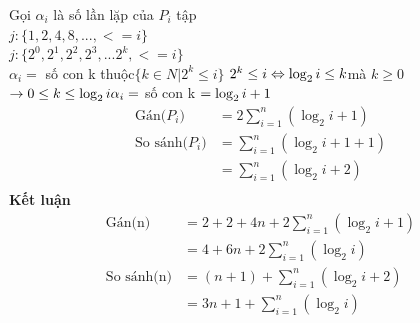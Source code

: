 \documentclass[10pt,a4paper]{article}
\begin{document}
    Gọi $\alpha_i$ là số lần lặp của $P_i$
    tập\\ $j:\{1,2,4,8,...,<=i\}$\\
    $j:\{2^0,2^1,2^2,2^3,...2^k,<=i\}$\\
    $\alpha_i = $ số con k thuộc$\{k\in N|2^k \leq i\}$
    $
        2^k \leq i\\
        \Leftrightarrow \log_2 i\leq k\\
        $mà $ k\geq 0$ $
        \rightarrow 0\leq k \leq \log_2 i\\
        \alpha_i = $ số con k $ = \log_2 i+1\\
    $
    \begin{align*}
        \text{Gán($P_i$)}
        &= 2\sum_{i=1}^{n}(\log_2 i+1) \\
        \text{So sánh($P_i$)}
        &=  \sum_{i=1}^{n}(\log_2 i+1+1)\\
        &=  \sum_{i=1}^{n}(\log_2 i+2)\\
    \end{align*}        
    \textbf{Kết luận}
    \begin{align*}
        \text{Gán(n)}
        &= 2+2+4n+2\sum_{i=1}^{n}(\log_2 i+1) \\
        &= 4+6n+2\sum_{i=1}^{n}(\log_2 i)\\
        \text{So sánh(n)}
        &= (n+1)+\sum_{i=1}^{n}(\log_2 i+2) \\
        &= 3n+1+\sum_{i=1}^{n}(\log_2 i)\\
    \end{align*}
\end{document}
